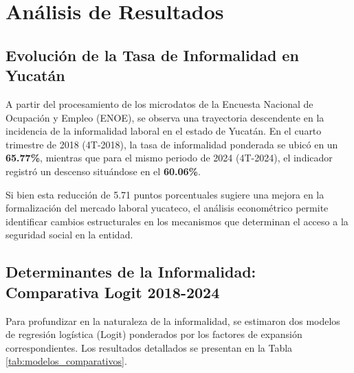 \section{Análisis de Resultados}

\subsection{Evolución de la Tasa de Informalidad en Yucatán}
A partir del procesamiento de los microdatos de la Encuesta Nacional de Ocupación y Empleo (ENOE), se observa una trayectoria descendente en la incidencia de la informalidad laboral en el estado de Yucatán. En el cuarto trimestre de 2018 (4T-2018), la tasa de informalidad ponderada se ubicó en un \textbf{65.77\%}, mientras que para el mismo periodo de 2024 (4T-2024), el indicador registró un descenso situándose en el \textbf{60.06\%}. 

Si bien esta reducción de 5.71 puntos porcentuales sugiere una mejora en la formalización del mercado laboral yucateco, el análisis econométrico permite identificar cambios estructurales en los mecanismos que determinan el acceso a la seguridad social en la entidad.

\subsection{Determinantes de la Informalidad: Comparativa Logit 2018-2024}
Para profundizar en la naturaleza de la informalidad, se estimaron dos modelos de regresión logística (Logit) ponderados por los factores de expansión correspondientes. Los resultados detallados se presentan en la Tabla \ref{tab:modelos_comparativos}.

